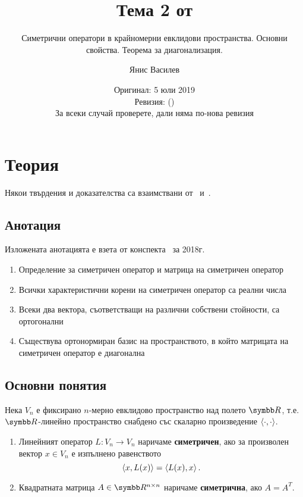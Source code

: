 \documentclass[numbers=endperiod, bibliography=totocnumbered]{scrartcl}
\title{Тема 2 от \URL{https://github.com/v--/se2018}}
\subtitle{Симетрични оператори в крайномерни евклидови пространства. Основни свойства. Теорема за диагонализация.}
\author{Янис Василев}
\date{Оригинал: 5 юли 2019 \\ Ревизия: \gitAbbrevHash{} (\gitAuthorDate) \\ За всеки случай проверете, дали няма по-нова ревизия}
\begin{document}
\maketitle

\section{Теория}

Някои твърдения и доказателства са взаимствани от~\cite{Knapp} и~\cite{RoyachkiNotes}.

\subsection{Анотация}

Изложената анотацията е взета от конспекта~\cite{Syllabus} за 2018г.

\begin{enumerate}
  \item Определение за симетричен оператор и матрица на симетричен оператор
  \item Всички характеристични корени на симетричен оператор са реални числа
  \item Всеки два вектора, съответстващи на различни собствени стойности, са ортогонални
  \item Съществува ортонормиран базис на пространството, в който матрицата на симетричен оператор е диагонална
\end{enumerate}

\subsection{Основни понятия}

Нека \( V_n \) е фиксирано \( n \)-мерно евклидово пространство над полето \( \R \), т.е. \( \R \)-линейно пространство снабдено със скаларно произведение \( \left\langle \cdot, \cdot \right\rangle \).

\begin{definition}
  \mbox{}
  \begin{enumerate}
    \item Линейният оператор \( L: V_n \to V_n \) наричаме \textbf{симетричен}, ако за произволен вектор \( x \in V_n \) е изпълнено равенството
    \begin{equation*}
      \left\langle x, L(x) \right\rangle = \left\langle L(x), x \right\rangle.
    \end{equation*}

    \item Квадратната матрица \( A \in \R^{n \times n} \) наричаме \textbf{симетрична}, ако \( A = A^T \).
  \end{enumerate}
\end{definition}
\end{document}

